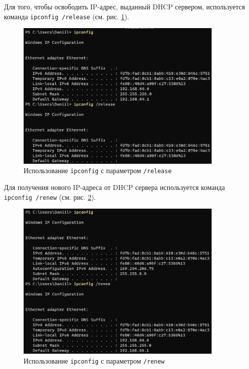 \documentclass[a4paper, 14pt]{extarticle}
\begin{document}
Для того, чтобы освободить IP-адрес, выданный DHCP сервером, используется
команда \texttt{ipconfig /release} (см. рис. \ref{fig:ipconfig-release}).

\begin{figure}[H]
  \centering
  \includegraphics[width=0.9\textwidth]{images/ipconfig/release.png}
  \caption{Использование \texttt{ipconfig} с параметром \texttt{/release}}
  \label{fig:ipconfig-release}
\end{figure}

Для получения нового IP-адреса от DHCP сервера используется команда
\texttt{ipconfig /renew} (см. рис. \ref{fig:ipconfig-renew}).

\begin{figure}[H]
  \centering
  \includegraphics[width=0.9\textwidth]{images/ipconfig/renew.png}
  \caption{Использование \texttt{ipconfig} с параметром \texttt{/renew}}
  \label{fig:ipconfig-renew}
\end{figure}
\end{document}
